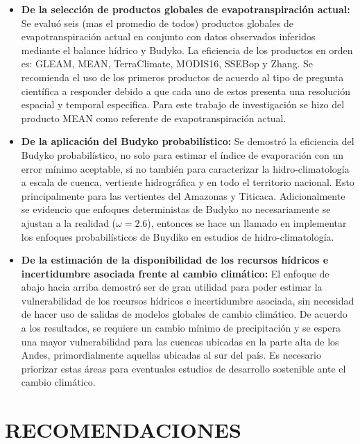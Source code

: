 \documentclass[12pt]{article}
\begin{document}
\begin{itemize}
    \item \textbf{De la selección de productos globales de evapotranspiración actual:} Se evaluó seis (mas el promedio de todos) productos globales de evapotranspiración actual en conjunto con datos observados inferidos mediante el balance hídrico y Budyko. La eficiencia de los productos en orden es: GLEAM, MEAN, TerraClimate, MODIS16, SSEBop y Zhang. Se recomienda el uso de los primeros productos de acuerdo al tipo de pregunta científica a responder debido a que cada uno de estos presenta una resolución espacial y temporal especifica. Para este trabajo de investigación se hizo del producto MEAN como referente de evapotranspiración actual.
    
    \item \textbf{De la aplicación del Budyko probabilístico:}
    Se demostró la eficiencia del Budyko probabilístico, no solo para estimar el índice de evaporación con un error mínimo aceptable, si no también para caracterizar la hidro-climatología a escala de cuenca, vertiente hidrográfica y en todo el territorio nacional. Esto principalmente para las vertientes del Amazonas y Titicaca. Adicionalmente se evidencio que enfoques deterministas de Budyko no necesariamente se ajustan a la realidad ($\omega = 2.6$), entonces se hace un llamado en implementar los enfoques probabilísticos de Buydiko en estudios de hidro-climatología.
    
    \item \textbf{De la estimación de la disponibilidad de los recursos hídricos e incertidumbre asociada frente al cambio climático:} El enfoque de abajo hacia arriba demostró ser de gran utilidad para poder estimar la vulnerabilidad de los recursos hídricos e incertidumbre asociada, sin necesidad de hacer uso de salidas de modelos globales de cambio climático. De acuerdo a los resultados, se requiere un cambio mínimo de precipitación y se espera una mayor vulnerabilidad para las cuencas ubicadas en la parte alta de los Andes, primordialmente aquellas ubicadas al sur del país. Es necesario priorizar estas áreas para eventuales estudios de desarrollo sostenible ante el cambio climático.
    
\end{itemize}


\clearpage
\vspace*{0.5mm}
\section{RECOMENDACIONES}
\end{document}
